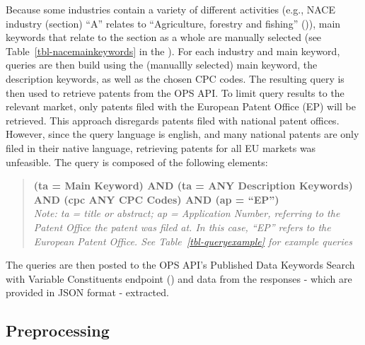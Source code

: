 \documentclass[
  11,
  a4paperpaper,
]{article}
\begin{document}
Because some industries contain a variety of different activities (e.g.,
NACE industry (section) ``A'' relates to ``Agriculture, forestry and
fishing'' ()),
main keywords that relate to the section as a whole are manually
selected (see Table~\ref{tbl-nacemainkeywords} in the
). For each industry and main keyword, queries are
then build using the (manuallly selected) main keyword, the description
keywords, as well as the chosen CPC codes. The resulting query is then
used to retrieve patents from the OPS API. To limit query results to the
relevant market, only patents filed with the European Patent Office (EP)
will be retrieved. This approach disregards patents filed with national
patent offices. However, since the query language is english, and many
national patents are only filed in their native language, retrieving
patents for all EU markets was unfeasible. The query is composed of the
following elements:

\begin{quote}
\textbf{(ta = Main Keyword) AND (ta = ANY Description Keywords) AND (cpc
ANY CPC Codes) AND (ap = ``EP'')}\\
\emph{Note: ta = title or abstract; ap = Application Number, referring
to the Patent Office the patent was filed at. In this case, ``EP''
refers to the European Patent Office. See Table~\ref{tbl-queryexample}
for example queries}
\end{quote}

The queries are then posted to the OPS API's Published Data Keywords
Search with Variable Constituents endpoint
() and data from the responses - which are provided in JSON
format - extracted.

\subsection{Preprocessing}\label{sec-preprocessing}
\end{document}
